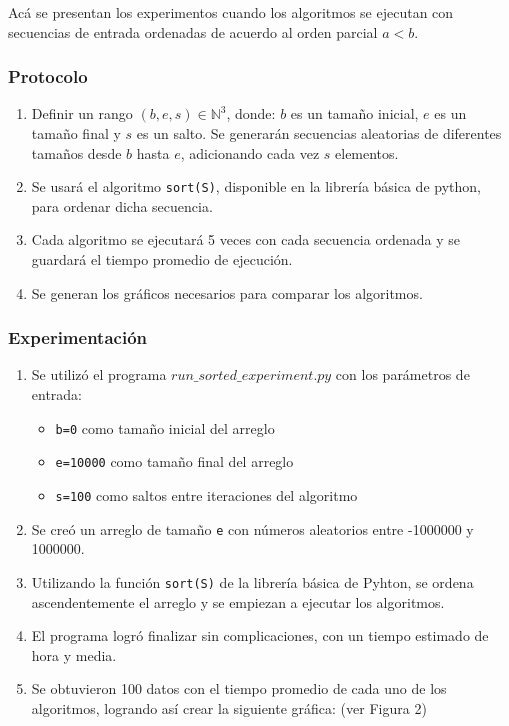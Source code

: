 \documentclass[letter]{article}
\begin{document}
Acá se presentan los experimentos cuando los algoritmos se ejecutan con secuencias de entrada ordenadas de acuerdo al orden parcial $a<b$.

\subsubsection{Protocolo}
\begin{enumerate}
    \item Definir un rango $(b,e,s)\in\mathbb{N}^3$, donde: $b$ es un tamaño inicial, $e$ es un tamaño final y $s$ es un salto. Se generarán secuencias aleatorias de diferentes tamaños desde $b$ hasta $e$, adicionando cada vez $s$ elementos.
    \item Se usará el algoritmo \texttt{sort(S)}, disponible en la librería básica de python, para ordenar dicha secuencia.
    \item Cada algoritmo se ejecutará 5 veces con cada secuencia ordenada y se guardará el tiempo promedio de ejecución.
    \item Se generan los gráficos necesarios para comparar los algoritmos.
\end{enumerate}

\subsubsection{Experimentación}
\begin{enumerate}
    \item Se utilizó el programa \texttt{$run\_sorted\_experiment.py$} con los parámetros de entrada:
    \begin{itemize}
        \item \texttt{b=0} como tamaño inicial del arreglo
        \item \texttt{e=10000} como tamaño final del arreglo
        \item \texttt{s=100} como saltos entre iteraciones del algoritmo
    \end{itemize}
    \item Se creó un arreglo de tamaño \texttt{e} con números aleatorios entre -1000000 y 1000000.
    \item Utilizando la función \texttt{sort(S)} de la librería básica de Pyhton, se ordena ascendentemente el arreglo y se empiezan a ejecutar los algoritmos. 
    \item El programa logró finalizar sin complicaciones, con un tiempo estimado de hora y media.
    \item Se obtuvieron 100 datos con el tiempo promedio de cada uno de los algoritmos, logrando así crear la siguiente gráfica: (ver Figura 2)
\end{enumerate}
\newpage
\end{document}
